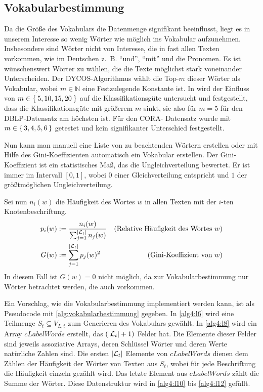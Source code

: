 \subsection{Vokabularbestimmung}\label{sec:vokabularbestimmung}
Da die Größe des Vokabulars die Datenmenge signifikant beeinflusst,
liegt es in unserem Interesse so wenig Wörter wie möglich ins
Vokabular aufzunehmen. Insbesondere sind Wörter nicht von Interesse,
die in fast allen Texten vorkommen, wie im Deutschen z.~B.
\enquote{und}, \enquote{mit} und die Pronomen. Es ist wünschenswert Wörter zu
wählen, die die Texte möglichst stark voneinander Unterscheiden. Der
DYCOS-Algorithmus wählt die Top-$m$ dieser Wörter als Vokabular, wobei
$m \in \mathbb{N}$ eine Festzulegende Konstante ist. In \cite[S. 365]{aggarwal2011}
wird der Einfluss von $m \in \Set{5,10, 15,20}$ auf die Klassifikationsgüte
untersucht und festgestellt, dass die Klassifikationsgüte mit größerem $m$
sinkt, sie also für $m=5$ für den DBLP-Datensatz am höchsten ist. Für den CORA-
Datensatz wurde mit $m \in \set{3,4,5,6}$ getestet und kein signifikanter
Unterschied festgestellt.

Nun kann man manuell eine Liste von zu beachtenden Wörtern erstellen
oder mit Hilfe des Gini-Koeffizienten automatisch ein Vokabular erstellen.
Der Gini-Koeffizient ist ein statistisches Maß, das die Ungleichverteilung
bewertet. Er ist immer im Intervall $[0,1]$, wobei $0$ einer
Gleichverteilung entspricht und $1$ der größtmöglichen Ungleichverteilung.

Sei nun $n_i(w)$ die Häufigkeit des Wortes $w$ in allen Texten mit der $i$-ten
Knotenbeschriftung.
\begin{align}
    p_i(w) &:= \frac{n_i(w)}{\sum_{j=1}^{|\mathcal{L}_t|} n_j(w)} &\text{(Relative Häufigkeit des Wortes $w$)}\\
    G(w)   &:= \sum_{j=1}^{|\mathcal{L}_t|} p_j(w)^2              &\text{(Gini-Koeffizient von $w$)}
\end{align}
In diesem Fall ist $G(w)=0$ nicht möglich, da zur Vokabularbestimmung nur
Wörter betrachtet werden, die auch vorkommen.

Ein Vorschlag, wie die Vokabularbestimmung implementiert werden kann, ist als
Pseudocode mit \cref{alg:vokabularbestimmung} gegeben. In \cref{alg4:l6} wird
eine Teilmenge $S_t \subseteq V_{L,t}$ zum Generieren des Vokabulars gewählt.
In \cref{alg4:l8} wird ein Array $cLabelWords$ erstellt, das $(|\mathcal{L}_t|+1)$
Felder hat. Die Elemente dieser Felder sind jeweils assoziative Arrays, deren
Schlüssel Wörter und deren Werte natürliche Zahlen sind. Die ersten $|\mathcal{L}_t|$
Elemente von $cLabelWords$ dienen dem Zählen der Häufigkeit der Wörter von
Texten aus $S_t$, wobei für jede Beschriftung die Häufigkeit einzeln gezählt
wird. Das letzte Element aus $cLabelWords$ zählt die Summe der Wörter. Diese
Datenstruktur wird in \cref{alg4:l10} bis \ref{alg4:l12} gefüllt.


